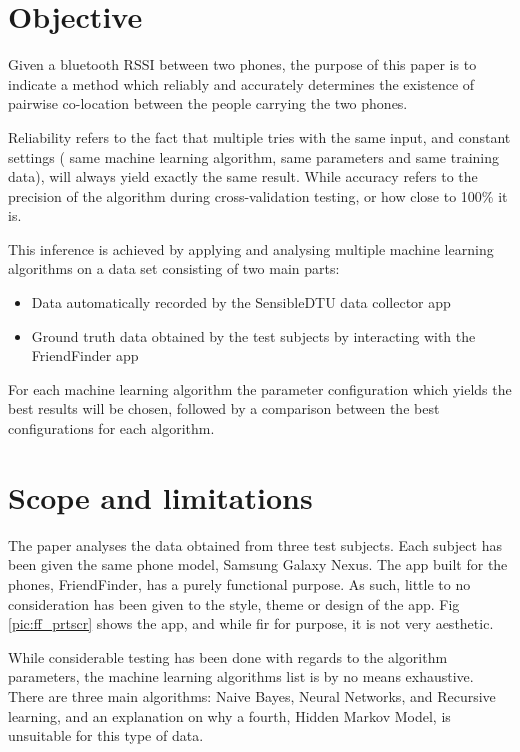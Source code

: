  
\section{Objective}

Given a bluetooth RSSI between two phones, the purpose of this paper is to indicate a method which reliably and accurately determines the existence of pairwise co-location between the people carrying the two phones.

Reliability refers to the fact that multiple tries with the same input, and constant settings ( same machine learning algorithm, same parameters and same training data), will always yield exactly the same result. While accuracy refers to the precision of the algorithm during cross-validation testing, or how close to 100\% it is. 
 
This inference is achieved by applying and analysing multiple machine learning algorithms on a data set consisting of two main parts:
\begin{itemize}
  \item Data automatically recorded by the SensibleDTU data collector app \cite{Stopczynski}
  \item Ground truth data obtained by the test subjects by interacting with the FriendFinder app
\end{itemize}

For each machine learning algorithm the parameter configuration which yields the best results will be chosen, followed by a comparison between the best configurations for each algorithm.      

\section{Scope and limitations}

The paper analyses the data obtained from three test subjects. Each subject has been given the same phone model, Samsung Galaxy Nexus. The app built for the phones, FriendFinder, has a purely functional purpose. As such, little to no consideration has been given to the style, theme or design of the app. Fig \ref{pic:ff_prtscr} shows the app, and while fir for purpose, it is not very aesthetic.

While considerable testing has been done with regards to the algorithm parameters, the machine learning algorithms list is by no means exhaustive. There are three main algorithms: Naive Bayes, Neural Networks, and Recursive learning, and an explanation on why a fourth, Hidden Markov Model, is unsuitable for this type of data. 

